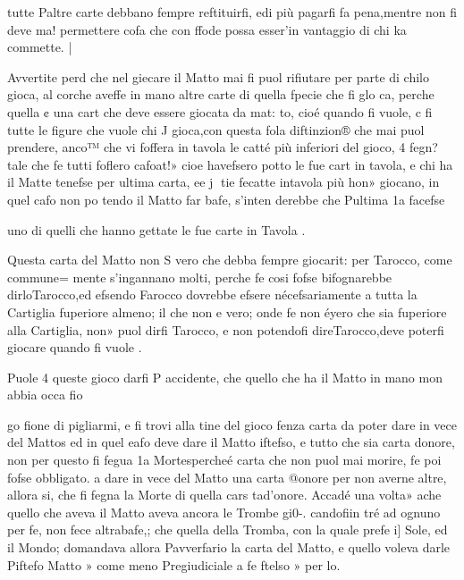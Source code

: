 \documentclass[11pt,a6paper]{article}
\begin{document}
 

 

 

 

 

tutte Paltre carte debbano fempre reftituirfi, edi più pagarfi
fa pena,mentre non fi deve ma!
permettere cofa che con ffode possa esser’in vantaggio di
chi ka commette. |

Avvertite perd che nel giecare il Matto mai fi puol rifiutare per parte di chilo gioca, al
corche aveffe in mano altre
carte di quella fpecie che fi glo
ca, perche quella ¢ una cart
che deve essere giocata da mat:
to, cioé quando fi vuole, c fi
tutte le figure che vuole chi J
gioca,con questa fola diftinzion®
che mai puol prendere, anco™
che vi foffera in tavola le catté
più inferiori del gioco, 4 fegn?
tale che fe tutti foflero cafoat!»
cioe havefsero potto le fue cart
in tavola, e chi ha il Matte
tenefse per ultima carta, ee j
tie fecatte intavola più hon»
giocano, in quel cafo non po
tendo il Matto far bafe, s'inten
derebbe che Pultima 1a facefse

uno di quelli che hanno gettate
le fue carte in Tavola .

Questa carta del Matto non S
vero che debba fempre giocarit:
per Tarocco, come commune=
mente s'ingannano molti, perche fe cosi fofse bifognarebbe
dirloTarocco,ed efsendo Farocco dovrebbe efsere nécefsariamente a tutta la Cartiglia fuperiore almeno; il che non e vero; onde fe non éyero che sia
fuperiore alla Cartiglia, non»
puol dirfi Tarocco, e non potendofi direTarocco,deve poterfi
giocare quando fi vuole .

Puole 4 queste gioco darfi P
accidente, che quello che ha il
Matto in mano mon abbia occa
fio
 

 
 

go
fione di pigliarmi, e fi trovi alla tine del gioco fenza carta da
poter dare in vece del Mattos
ed in quel eafo deve dare il Matto iftefso, e tutto che sia carta
donore, non per questo fi fegua
1a Mortespercheé carta che non
puol mai morire, fe poi fofse
obbligato. a dare in vece del
Matto una carta @onore per
non averne altre, allora si, che
fi fegna la Morte di quella cars
tad’onore. Accadé una volta»
ache quello che aveva il Matto
aveva ancora le Trombe gi0-.
candofiin tré ad ognuno per fe,
non fece altrabafe,; che quella
della Tromba, con la quale prefe i] Sole, ed il Mondo; domandava allora Pavverfario la carta
del Matto, e quello voleva darle Piftefo Matto » come meno
Pregiudiciale a fe ftelso » per lo.
\end{document}

